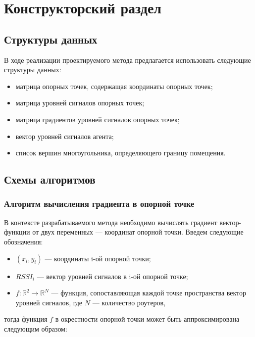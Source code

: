 \chapter{Конструкторский раздел}

\section{Структуры данных}

В ходе реализации проектируемого метода предлагается использовать следующие структуры данных:

\begin{itemize}[label=---,left=0.49cm]
    \item матрица опорных точек, содержащая координаты опорных точек;
    \item матрица уровней сигналов опорных точек;
    \item матрица градиентов уровней сигналов опорных точек;
    \item вектор уровней сигналов агента;
    \item список вершин многоугольника, определяющего границу помещения.
\end{itemize}

\section{Схемы алгоритмов}

\subsection{Алгоритм вычисления градиента в опорной точке}

В контексте разрабатываемого метода необходимо вычислять градиент вектор-функции от двух переменных --- координат опорной точки. Введем следующие обозначения:

\begin{itemize}[label=---,left=0.49cm]
    \item $(x_i, y_i)$ --- координаты i-ой опорной точки;
    \item $RSSI_i$ --- вектор уровней сигналов в i-ой опорной точке;
    \item $f: \mathbb{R}^2 \rightarrow \mathbb{R}^N$ --- функция, сопоставляющая каждой точке пространства вектор уровней сигналов, где $N$ --- количество роутеров,
\end{itemize}
тогда функция $f$ в окрестности опорной точки может быть аппроксимирована следующим образом:

